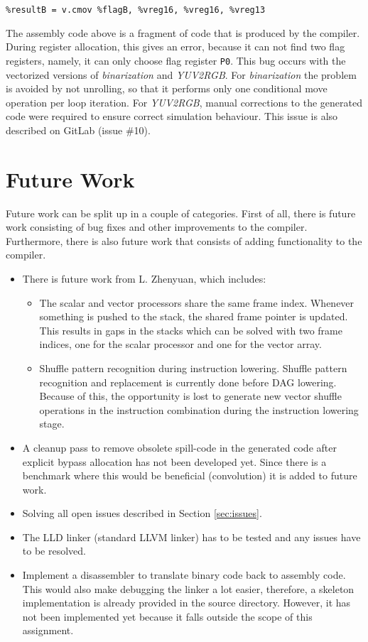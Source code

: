 \begin{itemize}
\begin{lstlisting}
%resultB = v.cmov %flagB, %vreg16, %vreg16, %vreg13
\end{lstlisting}
The assembly code above is a fragment of code that is produced by the compiler. During register allocation, this gives an error, because it can not find two flag registers, namely, it can only choose flag register \texttt{P0}. This bug occurs with the vectorized versions of \emph{binarization} and \emph{YUV2RGB}. For \emph{binarization} the problem is avoided by not unrolling, so that it performs only one conditional move operation per loop iteration. For \emph{YUV2RGB}, manual corrections to the generated code were required to ensure correct simulation behaviour. This issue is also described on GitLab (issue \#10).
\end{itemize}

\section{Future Work}\label{sec:future_work}
Future work can be split up in a couple of categories. First of all, there is future work consisting of bug fixes and other improvements to the compiler. Furthermore, there is also future work that consists of adding functionality to the compiler.
%
\begin{itemize}
    \item There is future work from L. Zhenyuan, which includes:
    \begin{itemize}
        \item The scalar and vector processors share the same frame index. Whenever something is pushed to the stack, the shared frame pointer is updated. This results in gaps in the stacks which can be solved with two frame indices, one for the scalar processor and one for the vector array.
        \item Shuffle pattern recognition during instruction lowering. Shuffle pattern recognition and replacement is currently done before DAG lowering. Because of this, the opportunity is lost to generate new vector shuffle operations in the instruction combination during the instruction lowering stage.
    \end{itemize}
    \item A cleanup pass to remove obsolete spill-code in the generated code after explicit bypass allocation has not been developed yet. Since there is a benchmark where this would be beneficial (convolution) it is added to future work.
    \item Solving all open issues described in Section \ref{sec:issues}.
    \item The LLD linker (standard LLVM linker) has to be tested and any issues have to be resolved.
    \item Implement a disassembler to translate binary code back to assembly code. This would also make debugging the linker a lot easier, therefore, a skeleton implementation is already provided in the source directory. However, it has not been implemented yet because it falls outside the scope of this assignment.
\end{itemize}

